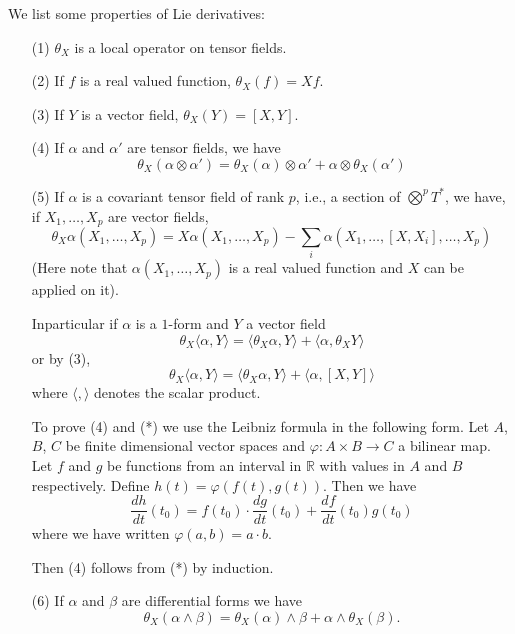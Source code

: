 We list some properties of Lie derivatives:
\begin{itemize}
\item[(1)] $\theta_{X}$ is a local operator on tensor fields.

\item[(2)] If $f$ is a real valued function, $\theta_{X}(f)=Xf$.

\item[(3)] If $Y$ is a vector field, $\theta_{X}(Y)=[X,Y]$.

\item[(4)] If $\alpha$ and $\alpha'$ are tensor fields, we have
$$
\theta_{X}(\alpha\otimes \alpha')=\theta_{X}(\alpha)\otimes \alpha'+\alpha\otimes\theta_{X}(\alpha')
$$

\item[(5)] If\label{page27} $\alpha$ is a covariant tensor field of rank $p$, i.e., a section of $\bigotimes\limits^{p}T^{*}$, we have, if $X_{1},\ldots,X_{p}$ are vector fields,
$$
\theta_{X}\alpha(X_{1},\ldots,X_{p})=X\alpha(X_{1},\ldots,X_{p})-\sum\limits_{i}\alpha(X_{1},\ldots,[X,X_{i}],\ldots,X_{p})
$$
(Here note that $\alpha(X_{1},\ldots,X_{p})$ is a real valued function and $X$ can be applied on it).

In\pageoriginale particular if $\alpha$ is a $1$-form and $Y$ a vector field
$$
\theta_{X}\langle \alpha, Y\rangle=\langle \theta_{X}\alpha,Y\rangle+\langle \alpha,\theta_{X}Y\rangle
$$
or by (3),
\begin{equation*}
\theta_{X}\langle \alpha,Y\rangle = \langle \theta_{X}\alpha,Y\rangle + \langle \alpha,[X,Y]\rangle\tag{*}
\end{equation*}\label{page28}
where $\langle,\rangle$ denotes the scalar product.

To prove (4) and (*) we use the Leibniz formula in the following form. Let $A$, $B$, $C$ be finite dimensional vector spaces and $\varphi:A\times B\to C$ a bilinear map. Let $f$ and $g$ be functions from an interval in $\mathbb{R}$ with values in $A$ and $B$ respectively. Define $h(t)=\varphi(f(t),g(t))$. Then we have
$$
\dfrac{dh}{dt}(t_{0})=f(t_{0})\cdot \dfrac{dg}{dt}(t_{0})+\dfrac{df}{dt}(t_{0})g(t_{0})
$$
where we have written $\varphi(a,b)=a\cdot b$.

Then (4) follows from (*) by induction.

\item[(6)] If $\alpha$ and $\beta$ are differential forms we have
$$
\theta_{X}(\alpha\wedge \beta)=\theta_{X}(\alpha)\wedge\beta+\alpha\wedge \theta_{X}(\beta).
$$ 
\end{itemize}

